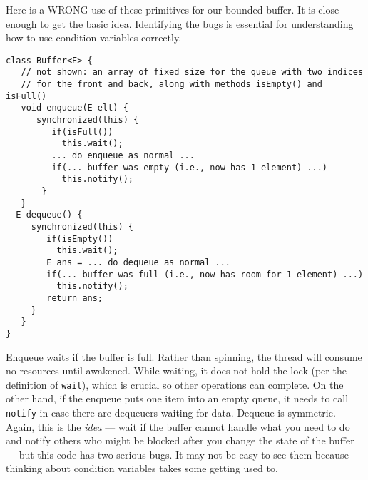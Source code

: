 \documentclass[10pt]{article}
\begin{document}
Here is a WRONG use of these primitives for our bounded buffer.  It is
close enough to get the basic idea. Identifying the bugs is
essential for understanding how to use condition variables correctly.
\begin{verbatim}
class Buffer<E> {
   // not shown: an array of fixed size for the queue with two indices
   // for the front and back, along with methods isEmpty() and isFull()
   void enqueue(E elt) {
      synchronized(this) {
         if(isFull())
           this.wait();    
         ... do enqueue as normal ...
         if(... buffer was empty (i.e., now has 1 element) ...)
           this.notify();
       }
   }
  E dequeue() {
     synchronized(this) {
        if(isEmpty())
          this.wait();
        E ans = ... do dequeue as normal ...
        if(... buffer was full (i.e., now has room for 1 element) ...)
          this.notify();
        return ans;
     }
   }
}
\end{verbatim}
Enqueue waits if the buffer is full.  Rather than spinning, the thread
will consume no resources until awakened.  While waiting, it does not
hold the lock (per the definition of {\tt wait}), which is crucial so
other operations can complete.  On the other hand, if the enqueue puts
one item into an empty queue, it needs to call {\tt notify} in case
there are dequeuers waiting for data.  Dequeue is symmetric.  Again,
this is the \emph{idea} --- wait if the buffer cannot handle what you
need to do and notify others who might be blocked after you change the
state of the buffer --- but this code has two serious bugs.  It may
not be easy to see them because thinking about condition variables
takes some getting used to.
\end{document}
